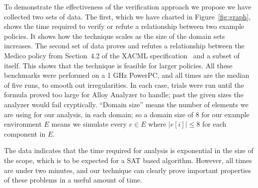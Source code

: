 To demonstrate the effectiveness of the verification approach we propose 
we have collected 
two sets of data.  The first, which we have charted in
Figure~\ref{fig:graph}, shows the time required to verify or refute a
relationship between two example policies.  It shows how the technique
scales as the size of the domain sets increases.  The second set of
data proves and refutes a relationship between the Medico policy from
Section~4.2 of the XACML specification~\cite{xacml} and a subset of
itself.  This shows that the technique is feasible for larger
policies.  All these benchmarks were performed on a 1 GHz PowerPC, and
all times are the median of five runs, to smooth out irregularities.
In each case, trials were run until the formula proved too large for
Alloy Analyzer to handle; past the given sizes the analyzer would fail
cryptically.  ``Domain size'' means the number of elements we are
using for our analysis, in each domain; so a domain size of 8 for our
example environment $E$ means we simulate every $e \in E$ where
$|e[i]| \leq 8$ for each component in $E$.

The data indicates that the time required for analysis is exponential
in the size of the scope, which is to be expected for a SAT based
algorithm.  However, all times are under two minutes, and our
technique can clearly prove important properties of these problems in
a useful amount of time.


